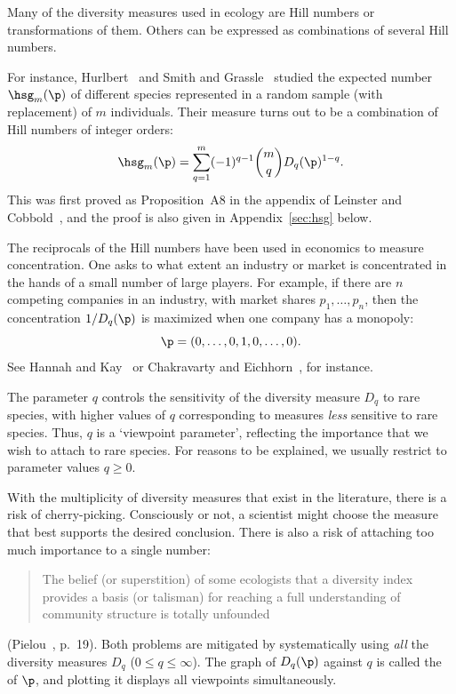 \begin{example}
Many of the diversity measures used in ecology are Hill numbers or
transformations of them.  Others can be expressed as combinations of
several Hill numbers.

For instance, Hurlbert~\cite{Hurl}%
% 
%
% 
and Smith and Grassle~\cite{SmGr} studied the expected number
$\hsg_m(\p)$ of different species represented in a random sample
(with replacement) of $m$ individuals.  Their measure turns out to be a
combination of Hill numbers of integer orders:
\[
\hsg_m(\p)
=
\sum_{q = 1}^m (-1)^{q - 1} \binom{m}{q} D_q(\p)^{1 - q}.
\]
This was first proved as Proposition~A8 in the appendix of Leinster and
Cobbold~\cite{MDISS}, and the proof is also given in
Appendix~\ref{sec:hsg} below. 
\end{example}

\begin{example}
The reciprocals of the Hill numbers have been used in
economics to measure concentration.
One asks to what extent an industry or market is concentrated in the
hands of a small number of large players.  For example, if there are $n$
competing companies in an industry, with market shares $p_1, \ldots, p_n$,
then the concentration $1/D_q(\p)$ is maximized when one company has a
monopoly:
\[
\p = (0, \ldots, 0, 1, 0, \ldots, 0).
\]
See Hannah and Kay~\cite{HaKa} or Chakravarty and Eichhorn~\cite{ChEi}, for
instance. 
\end{example}

The parameter $q$ controls the sensitivity of the diversity measure $D_q$
to rare species, with higher values of $q$ corresponding to measures
\emph{less} sensitive to rare species.  Thus, $q$ is a
`viewpoint%
% 
% 
parameter', reflecting the importance that we wish to attach to rare
species.  For reasons to be explained, we usually restrict to
parameter values $q \geq 0$.

With the multiplicity of diversity measures that exist in the literature,
there is a risk of cherry-picking. Consciously or
not, a scientist might choose the measure that best supports the desired
conclusion.  There is also a risk of attaching too much importance to a
single number:
% 
\begin{quote}
% 
The belief (or superstition) of some ecologists that a diversity index
provides a basis (or talisman) for reaching a full understanding of
community structure is totally unfounded
\end{quote}
%
(Pielou~\cite{PielED}, p.~19).  Both problems are mitigated by
systematically using \emph{all} the diversity measures $D_q$ ($0 \leq q
\leq \infty$).  The graph of $D_q(\p)$ against $q$ is called the
 of $\p$, and plotting it displays all viewpoints%
%
% 
simultaneously.

